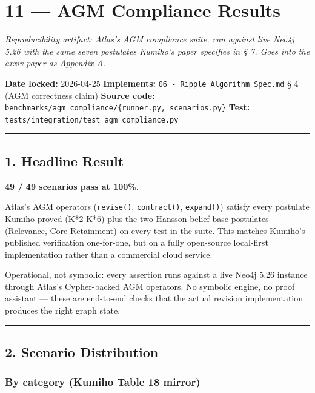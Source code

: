 \documentclass[
]{article}
\author{}
\date{}
\begin{document}
\section{11 --- AGM Compliance Results}\label{agm-compliance-results}

\emph{Reproducibility artifact: Atlas's AGM compliance suite, run
against live Neo4j 5.26 with the same seven postulates Kumiho's paper
specifies in § 7. Goes into the arxiv paper as Appendix A.}

\textbf{Date locked:} 2026-04-25 \textbf{Implements:}
\texttt{06\ -\ Ripple\ Algorithm\ Spec.md} § 4 (AGM correctness claim)
\textbf{Source code:}
\texttt{benchmarks/agm\_compliance/\{runner.py,\ scenarios.py\}}
\textbf{Test:} \texttt{tests/integration/test\_agm\_compliance.py}

\begin{center}\rule{0.5\linewidth}{0.5pt}\end{center}

\subsection{1. Headline Result}\label{headline-result}

\textbf{49 / 49 scenarios pass at 100\%.}

Atlas's AGM operators (\texttt{revise()}, \texttt{contract()},
\texttt{expand()}) satisfy every postulate Kumiho proved (K*2-K*6) plus
the two Hansson belief-base postulates (Relevance, Core-Retainment) on
every test in the suite. This matches Kumiho's published verification
one-for-one, but on a fully open-source local-first implementation
rather than a commercial cloud service.

Operational, not symbolic: every assertion runs against a live Neo4j
5.26 instance through Atlas's Cypher-backed AGM operators. No symbolic
engine, no proof assistant --- these are end-to-end checks that the
actual revision implementation produces the right graph state.

\begin{center}\rule{0.5\linewidth}{0.5pt}\end{center}

\subsection{2. Scenario Distribution}\label{scenario-distribution}

\subsubsection{By category (Kumiho Table 18
mirror)}\label{by-category-kumiho-table-18-mirror}
\end{document}
